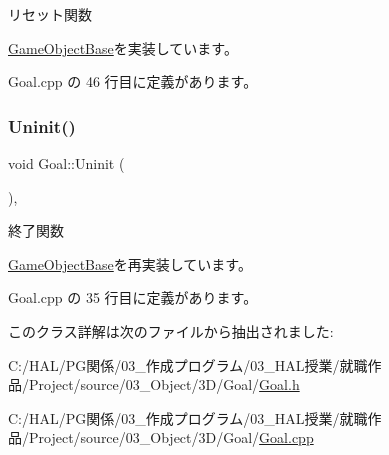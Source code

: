 リセット関数 



\mbox{\hyperlink{class_game_object_base_a85c59554f734bcb09f1a1e18d9517dce}{Game\+Object\+Base}}を実装しています。



 Goal.\+cpp の 46 行目に定義があります。

\mbox{\label{class_goal_a48126385a674bcda855e2a61561fbf9f}} 
\subsubsection{\texorpdfstring{Uninit()}{Uninit()}}
{\footnotesize\ttfamily void Goal\+::\+Uninit (\begin{DoxyParamCaption}{ }\end{DoxyParamCaption})\hspace{0.3cm}{\ttfamily [override]}, {\ttfamily [virtual]}}



終了関数 



\mbox{\hyperlink{class_game_object_base_a97e1bc277d7b1c0156d4735de29a022c}{Game\+Object\+Base}}を再実装しています。



 Goal.\+cpp の 35 行目に定義があります。



このクラス詳解は次のファイルから抽出されました\+:\begin{DoxyCompactItemize}
\item 
C\+:/\+H\+A\+L/\+P\+G関係/03\+\_\+作成プログラム/03\+\_\+\+H\+A\+L授業/就職作品/\+Project/source/03\+\_\+\+Object/3\+D/\+Goal/\mbox{\hyperlink{_goal_8h}{Goal.\+h}}\item 
C\+:/\+H\+A\+L/\+P\+G関係/03\+\_\+作成プログラム/03\+\_\+\+H\+A\+L授業/就職作品/\+Project/source/03\+\_\+\+Object/3\+D/\+Goal/\mbox{\hyperlink{_goal_8cpp}{Goal.\+cpp}}\end{DoxyCompactItemize}
